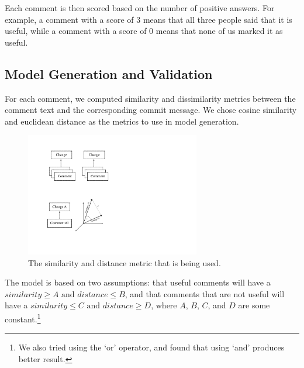 \documentclass[conference]{IEEEtran}
\begin{document}
Each comment is then scored based on the number of positive answers.
For example, a comment with a score of 3 means that all three people said that it is useful,
while a comment with a score of 0 means that none of us marked it as useful.






\subsection{Model Generation and Validation}

For each comment, we computed similarity and dissimilarity metrics
between the comment text and the corresponding commit message.
We chose cosine similarity and euclidean distance as the metrics to use in model generation.

\begin{figure}[h]
\centering
\includegraphics[width=3in]{vector}
\caption{The similarity and distance metric that is being used.}
\label{fig:vector}
\end{figure}

The model is based on two assumptions: that useful comments will have a $similarity \geq A \text{ and } distance \leq B$,
and that comments that are not useful will have a $ similarity \leq C \text{ and } distance \geq D$,
where $A$, $B$, $C$, and $D$ are some constant.\footnote{We also tried using the `or' operator, and found that using `and' produces better result.}
\end{document}

